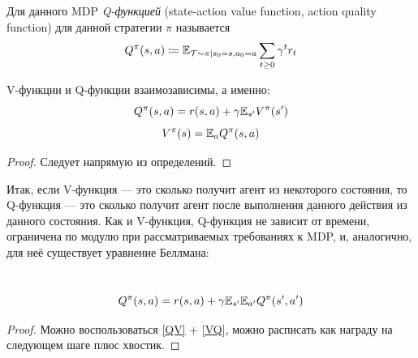 \begin{definition} 
Для данного MDP \emph{Q-функцией} (state-action value function, action quality function) для данной стратегии $\pi$ называется
$$Q^\pi(s, a) \coloneqq \mathbb{E}_{\mathcal{T} \sim \pi \mid s_0 = s, a_0 = a} \sum_{t \ge 0} \gamma^t r_t$$
\end{definition}

\begin{theorem}
V-функции и Q-функции взаимозависимы, а именно:
\begin{equation}\label{QV}
    Q^\pi(s, a) =  r(s, a) + \gamma \mathbb{E}_{s'} V^\pi(s')
\end{equation}
\begin{equation}\label{VQ}
    V^\pi(s) = \mathbb{E}_{a} Q^\pi(s, a)
\end{equation}
\begin{proof}
Следует напрямую из определений.
\end{proof}
\end{theorem}

Итак, если V-функция --- это сколько получит агент из некоторого состояния, то Q-функция --- это сколько получит агент после выполнения данного действия из данного состояния. Как и V-функция, Q-функция не зависит от времени, ограничена по модулю при рассматриваемых требованиях к MDP, и, аналогично, для неё существует уравнение Беллмана:

\begin{theorem}
\,
\begin{equation}\label{QQ}
    Q^\pi(s, a) =  r(s, a) + \gamma \mathbb{E}_{s'} \mathbb{E}_{a'} Q^\pi(s', a')
\end{equation}
\begin{proof}
Можно воспользоваться \eqref{QV} + \eqref{VQ}, можно расписать как награду на следующем шаге плюс хвостик.
\end{proof}
\end{theorem}

